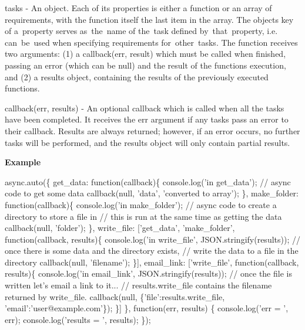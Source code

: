 \begin{DoxyItemize}
\item {\ttfamily tasks} -\/ An object. Each of its properties is either a function or an array of requirements, with the function itself the last item in the array. The object\textquotesingle{}s key of a property serves as the name of the task defined by that property, i.\+e. can be used when specifying requirements for other tasks. The function receives two arguments\+: (1) a {\ttfamily callback(err, result)} which must be called when finished, passing an {\ttfamily error} (which can be {\ttfamily null}) and the result of the function\textquotesingle{}s execution, and (2) a {\ttfamily results} object, containing the results of the previously executed functions.
\item {\ttfamily callback(err, results)} -\/ An optional callback which is called when all the tasks have been completed. It receives the {\ttfamily err} argument if any {\ttfamily tasks} pass an error to their callback. Results are always returned; however, if an error occurs, no further {\ttfamily tasks} will be performed, and the results object will only contain partial results.
\end{DoxyItemize}

{\bfseries Example}


\begin{DoxyCode}
async.auto(\{
    get\_data: \textcolor{keyword}{function}(callback)\{
        console.log(\textcolor{stringliteral}{'in get\_data'});
        \textcolor{comment}{// async code to get some data}
        callback(null, \textcolor{stringliteral}{'data'}, \textcolor{stringliteral}{'converted to array'});
    \},
    make\_folder: \textcolor{keyword}{function}(callback)\{
        console.log(\textcolor{stringliteral}{'in make\_folder'});
        \textcolor{comment}{// async code to create a directory to store a file in}
        \textcolor{comment}{// this is run at the same time as getting the data}
        callback(null, \textcolor{stringliteral}{'folder'});
    \},
    write\_file: [\textcolor{stringliteral}{'get\_data'}, \textcolor{stringliteral}{'make\_folder'}, \textcolor{keyword}{function}(callback, results)\{
        console.log(\textcolor{stringliteral}{'in write\_file'}, JSON.stringify(results));
        \textcolor{comment}{// once there is some data and the directory exists,}
        \textcolor{comment}{// write the data to a file in the directory}
        callback(null, \textcolor{stringliteral}{'filename'});
    \}],
    email\_link: [\textcolor{stringliteral}{'write\_file'}, \textcolor{keyword}{function}(callback, results)\{
        console.log(\textcolor{stringliteral}{'in email\_link'}, JSON.stringify(results));
        \textcolor{comment}{// once the file is written let's email a link to it...}
        \textcolor{comment}{// results.write\_file contains the filename returned by write\_file.}
        callback(null, \{\textcolor{stringliteral}{'file'}:results.write\_file, \textcolor{stringliteral}{'email'}:\textcolor{stringliteral}{'user@example.com'}\});
    \}]
\}, \textcolor{keyword}{function}(err, results) \{
    console.log(\textcolor{stringliteral}{'err = '}, err);
    console.log(\textcolor{stringliteral}{'results = '}, results);
\});
\end{DoxyCode}


